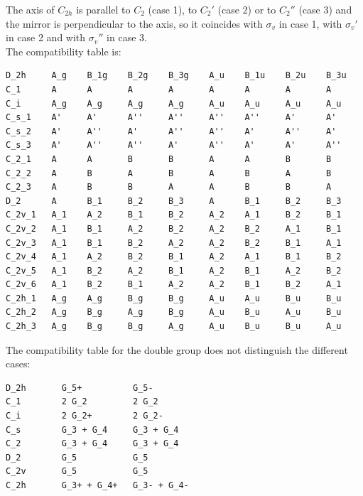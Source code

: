 \documentclass[12pt,a4paper]{article}
\begin{document}
The axis of $C_{2h}$ is parallel to $C_2$ (case 1),
to $C_2'$ (case 2) or to $C_2''$ (case 3) and the mirror is perpendicular
to the axis, so it coincides with $\sigma_v$ in case 1, with $\sigma_v'$ in
case 2 and with $\sigma_v''$ in case 3. \\
The compatibility table is:
\begin{verbatim}
D_2h     A_g    B_1g    B_2g    B_3g    A_u    B_1u    B_2u    B_3u     
C_1      A      A       A       A       A      A       A       A
C_i      A_g    A_g     A_g     A_g     A_u    A_u     A_u     A_u 
C_s_1    A'     A'      A''     A''     A''    A''     A'      A'   
C_s_2    A'     A''     A'      A''     A''    A'      A''     A'   
C_s_3    A'     A''     A''     A'      A''    A'      A'      A''   
C_2_1    A      A       B       B       A      A       B       B
C_2_2    A      B       A       B       A      B       A       B
C_2_3    A      B       B       A       A      B       B       A 
D_2      A      B_1     B_2     B_3     A      B_1     B_2     B_3
C_2v_1   A_1    A_2     B_1     B_2     A_2    A_1     B_2     B_1   
C_2v_2   A_1    B_1     A_2     B_2     A_2    B_2     A_1     B_1   
C_2v_3   A_1    B_1     B_2     A_2     A_2    B_2     B_1     A_1   
C_2v_4   A_1    A_2     B_2     B_1     A_2    A_1     B_1     B_2
C_2v_5   A_1    B_2     A_2     B_1     A_2    B_1     A_2     B_2
C_2v_6   A_1    B_2     B_1     A_2     A_2    B_1     B_2     A_1
C_2h_1   A_g    A_g     B_g     B_g     A_u    A_u     B_u     B_u   
C_2h_2   A_g    B_g     A_g     B_g     A_u    B_u     A_u     B_u   
C_2h_3   A_g    B_g     B_g     A_g     A_u    B_u     B_u     A_u   
\end{verbatim}
The compatibility table for the double group does not distinguish the
different cases: 
\begin{verbatim}
D_2h       G_5+          G_5-
C_1        2 G_2         2 G_2
C_i        2 G_2+        2 G_2-
C_s        G_3 + G_4     G_3 + G_4
C_2        G_3 + G_4     G_3 + G_4
D_2        G_5           G_5
C_2v       G_5           G_5
C_2h       G_3+ + G_4+   G_3- + G_4-
\end{verbatim}
\end{document}
